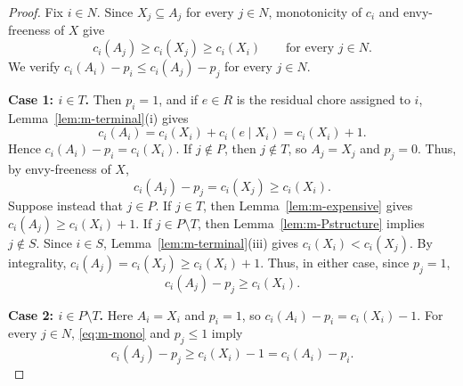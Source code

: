 \documentclass[sigconf,anonymous]{aamas}
\newcommand{\agents}{N}
\newcommand{\subsidy}{p}
\newcommand{\cost}{c}
\theoremstyle{acmplain}
\theoremstyle{acmdefinition}
\theoremstyle{acmplain}
\begin{document}
\begin{proof}
Fix $i\in\agents$. Since $X_j\subseteq A_j$ for every $j\in\agents$, monotonicity of $\cost_i$ and envy-freeness of $X$ give
\begin{equation}
\label{eq:m-mono}
    \cost_i(A_j)
    \geq \cost_i(X_j)
    \geq \cost_i(X_i)
    \qquad\text{for every }j\in\agents.
\end{equation}
We verify
\(\cost_i(A_i)-\subsidy_i \leq \cost_i(A_j)-\subsidy_j \) for every $j\in\agents$.

\smallskip
\noindent\textbf{Case 1: $i\in T$.}
Then $\subsidy_i=1$, and if $e\in R$ is the residual chore assigned to $i$, Lemma~\ref{lem:m-terminal}(i) gives
\[
    \cost_i(A_i)
    =\cost_i(X_i)+\cost_i(e\mid X_i)
    =\cost_i(X_i)+1.
\]
Hence $\cost_i(A_i)-\subsidy_i=\cost_i(X_i)$. If $j\notin P$, then $j\notin T$, so $A_j=X_j$ and $\subsidy_j=0$. Thus, by envy-freeness of $X$,
\[
    \cost_i(A_j)-\subsidy_j
    =\cost_i(X_j)
    \geq \cost_i(X_i).
\] Suppose instead that $j\in P$. If $j\in T$, then Lemma~\ref{lem:m-expensive} gives \( \cost_i(A_j)\geq \cost_i(X_i)+1. \) If $j\in P\setminus T$, then Lemma~\ref{lem:m-Pstructure} implies $j\notin S$. Since $i\in S$, Lemma~\ref{lem:m-terminal}(iii) gives \(\cost_i(X_i)<\cost_i(X_j).\) By integrality, \(  \cost_i(A_j)=\cost_i(X_j)\geq \cost_i(X_i)+1. \) Thus, in either case, since $\subsidy_j=1$,
\[
    \cost_i(A_j)-\subsidy_j\geq \cost_i(X_i).
\]

\smallskip
\noindent\textbf{Case 2: $i\in P\setminus T$.} Here $A_i=X_i$ and $\subsidy_i=1$, so \(\cost_i(A_i)-\subsidy_i=\cost_i(X_i)-1. \) For every $j\in\agents$, \eqref{eq:m-mono} and $\subsidy_j\leq 1$ imply
\[
    \cost_i(A_j)-\subsidy_j
    \geq \cost_i(X_i)-1
    =\cost_i(A_i)-\subsidy_i.
\]


\end{proof}
\end{document}
